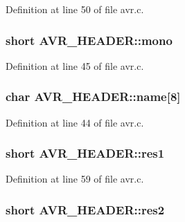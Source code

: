 Definition at line 50 of file avr.\+c.

\subsubsection[{\texorpdfstring{mono}{mono}}]{\setlength{\rightskip}{0pt plus 5cm}short A\+V\+R\+\_\+\+H\+E\+A\+D\+E\+R\+::mono}\hypertarget{struct_a_v_r___h_e_a_d_e_r_a961b3ca41e2f54642cd8039fe73a69de}{}\label{struct_a_v_r___h_e_a_d_e_r_a961b3ca41e2f54642cd8039fe73a69de}


Definition at line 45 of file avr.\+c.

\subsubsection[{\texorpdfstring{name}{name}}]{\setlength{\rightskip}{0pt plus 5cm}char A\+V\+R\+\_\+\+H\+E\+A\+D\+E\+R\+::name\mbox{[}8\mbox{]}}\hypertarget{struct_a_v_r___h_e_a_d_e_r_a16fef12e69100aa181317a6c387aa7ff}{}\label{struct_a_v_r___h_e_a_d_e_r_a16fef12e69100aa181317a6c387aa7ff}


Definition at line 44 of file avr.\+c.

\subsubsection[{\texorpdfstring{res1}{res1}}]{\setlength{\rightskip}{0pt plus 5cm}short A\+V\+R\+\_\+\+H\+E\+A\+D\+E\+R\+::res1}\hypertarget{struct_a_v_r___h_e_a_d_e_r_ab9dfa7b0721cd747f745c7bb32c00ae5}{}\label{struct_a_v_r___h_e_a_d_e_r_ab9dfa7b0721cd747f745c7bb32c00ae5}


Definition at line 59 of file avr.\+c.

\subsubsection[{\texorpdfstring{res2}{res2}}]{\setlength{\rightskip}{0pt plus 5cm}short A\+V\+R\+\_\+\+H\+E\+A\+D\+E\+R\+::res2}\hypertarget{struct_a_v_r___h_e_a_d_e_r_a7353a6f33643f3ffd1311af383e18fc0}{}\label{struct_a_v_r___h_e_a_d_e_r_a7353a6f33643f3ffd1311af383e18fc0}



